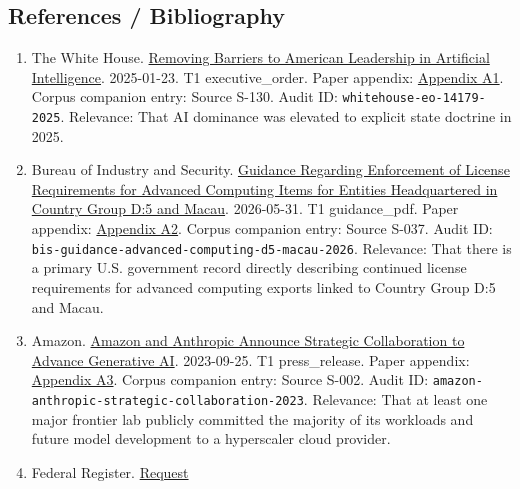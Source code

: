 \documentclass[
  american,
  11pt,
  letterpaper,
]{article}
\providecommand{\tightlist}{%
  \setlength{\itemsep}{0pt}\setlength{\parskip}{0pt}}
\begin{document}
\subsection{References / Bibliography}\label{references-bibliography}

\begin{enumerate}
\def\labelenumi{\arabic{enumi}.}
\tightlist
\item
  The White House.
  \href{https://www.whitehouse.gov/presidential-actions/2025/01/removing-barriers-to-american-leadership-in-artificial-intelligence/}{Removing
  Barriers to American Leadership in Artificial Intelligence}.
  2025-01-23. T1 executive\_order. Paper appendix:
  \hyperref[appendix-a1-removing-barriers-to-american-leadership-in-artificial-intelligence]{Appendix
  A1}. Corpus companion entry: Source S-130. Audit ID:
  \texttt{whitehouse-eo-14179-2025}. Relevance: That AI dominance was
  elevated to explicit state doctrine in 2025.
\item
  Bureau of Industry and Security.
  \href{https://www.bis.gov/media/documents/bis-guidance-may-31-2026.pdf}{Guidance
  Regarding Enforcement of License Requirements for Advanced Computing
  Items for Entities Headquartered in Country Group D:5 and Macau}.
  2026-05-31. T1 guidance\_pdf. Paper appendix:
  \hyperref[appendix-a2-guidance-regarding-enforcement-of-license-requirements-for-advanced-computing-items-for-entities-headquartered-in-country-group-d-5-and-macau]{Appendix
  A2}. Corpus companion entry: Source S-037. Audit ID:
  \texttt{bis-guidance-advanced-computing-d5-macau-2026}. Relevance:
  That there is a primary U.S. government record directly describing
  continued license requirements for advanced computing exports linked
  to Country Group D:5 and Macau.
\item
  Amazon.
  \href{https://press.aboutamazon.com/2023/9/amazon-and-anthropic-announce-strategic-collaboration-to-advance-generative-ai}{Amazon
  and Anthropic Announce Strategic Collaboration to Advance Generative
  AI}. 2023-09-25. T1 press\_release. Paper appendix:
  \hyperref[appendix-a3-amazon-and-anthropic-announce-strategic-collaboration-to-advance-generative-ai]{Appendix
  A3}. Corpus companion entry: Source S-002. Audit ID:
  \texttt{amazon-anthropic-strategic-collaboration-2023}. Relevance:
  That at least one major frontier lab publicly committed the majority
  of its workloads and future model development to a hyperscaler cloud
  provider.
\item
  Federal Register.
  \href{https://www.federalregister.gov/documents/2025/02/06/2025-02305/request-for-information-on-the-development-of-an-artificial-intelligence-ai-action-plan}{Request
}
\end{enumerate}
\end{document}
